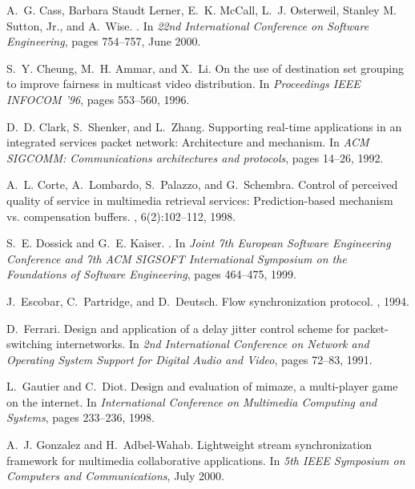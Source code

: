 \documentclass{sig-alternate}
\begin{document}
\begin{thebibliography}{10}
A.~G. Cass, {Barbara Staudt Lerner}, E.~K. McCall, L.~J. Osterweil, {Stanley M.
  Sutton, Jr.}, and A.~Wise.
.
\newblock In {\em 22nd International Conference on Software Engineering}, pages
  754--757, June 2000.

S.~Y. Cheung, M.~H. Ammar, and X.~Li.
\newblock On the use of destination set grouping to improve fairness in
  multicast video distribution.
\newblock In {\em Proceedings IEEE INFOCOM '96}, pages 553--560, 1996.

D.~D. Clark, S.~Shenker, and L.~Zhang.
\newblock Supporting real-time applications in an integrated services packet
  network: Architecture and mechanism.
\newblock In {\em {ACM SIGCOMM: Communications architectures and protocols}},
  pages 14--26, 1992.

A.~L. Corte, A.~Lombardo, S.~Palazzo, and G.~Schembra.
\newblock Control of perceived quality of service in multimedia retrieval
  services: Prediction-based mechanism vs. compensation buffers.
, 6(2):102--112, 1998.

S.~E. Dossick and G.~E. Kaiser.
.
\newblock In {\em Joint 7th European Software Engineering Conference and 7th
  ACM SIGSOFT International Symposium on the Foundations of Software
  Engineering}, pages 464--475, 1999.

J.~Escobar, C.~Partridge, and D.~Deutsch.
\newblock Flow synchronization protocol.
, 1994.

D.~Ferrari.
\newblock Design and application of a delay jitter control scheme for
  packet-switching internetworks.
\newblock In {\em 2nd International Conference on Network and Operating System
  Support for Digital Audio and Video}, pages 72--83, 1991.

L.~Gautier and C.~Diot.
\newblock Design and evaluation of mimaze, a multi-player game on the internet.
\newblock In {\em International Conference on Multimedia Computing and
  Systems}, pages 233--236, 1998.

A.~J. Gonzalez and H.~Adbel-Wahab.
\newblock Lightweight stream synchronization framework for multimedia
  collaborative applications.
\newblock In {\em 5th IEEE Symposium on Computers and Communications}, July
  2000.


\end{thebibliography}
\end{document}
